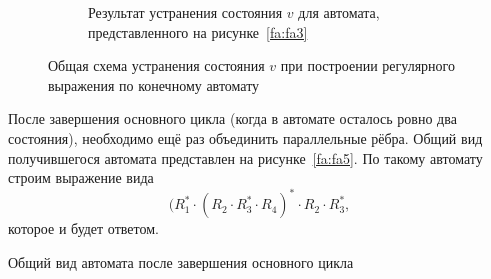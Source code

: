 \begin{figure}
\begin{center}
\begin{subfigure}[b]{0.47\textwidth}
\begin{center}
            
            \end{center}
            
            \caption{Результат устранения состояния $v$ для автомата, представленного на рисунке~\ref{fa:fa3}}
            \label{fa:fa4}
        \end{subfigure}
    \end{center}
    \caption{Общая схема устранения состояния $v$ при построении регулярного выражения по конечному автомату}
    \label{fa:fa_3_4}    
\end{figure}

После завершения основного цикла (когда в автомате осталось ровно два состояния), необходимо ещё раз объединить параллельные рёбра.
Общий вид получившегося автомата представлен на рисунке~\ref{fa:fa5}.
По такому автомату строим выражение вида \[(R_1^* \cdot (R_2 \cdot R_3^* \cdot R_4 )^* \cdot R_2 \cdot R_3^*,\] которое и будет ответом.
\begin{marginfigure}
    
    \begin{center}

    \end{center}

    \caption{Общий вид автомата после завершения основного цикла}
    \label{fa:fa5}

\end{marginfigure}

